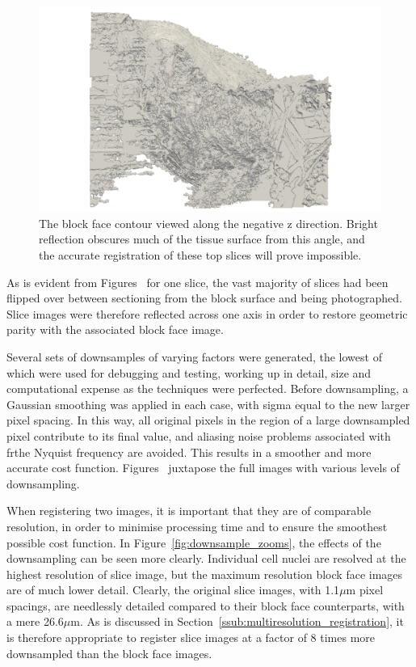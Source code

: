     \begin{figure}
      \centering
      \includegraphics[width=\textheight]{Ch6/Figs/Rat28/contours/LoRes_negative_z}
      \caption{The block face contour viewed along the negative z direction. Bright reflection obscures much of the tissue surface from this angle, and the accurate registration of these top slices will prove impossible.}
      \label{fig:LoRes_negative_z}
    \end{figure}
    
	As is evident from Figures~ for one slice, the vast majority of slices had been flipped over between sectioning from the block surface and being photographed. Slice images were therefore reflected across one axis in order to restore geometric parity with the associated block face image.
	
	 Several sets of downsamples of varying factors were generated, the lowest of which were used for debugging and testing, working up in detail, size and computational expense as the techniques were perfected. Before downsampling, a Gaussian smoothing was applied in each case, with sigma equal to the new larger pixel spacing. In this way, all original pixels in the region of a large downsampled pixel contribute to its final value, and aliasing noise problems associated with frthe Nyquist frequency are avoided. This results in a smoother and more accurate cost function. Figures~ juxtapose the full images with various levels of downsampling.
	 
	 When registering two images, it is important that they are of comparable resolution, in order to minimise processing time and to ensure the smoothest possible cost function. In Figure~\ref{fig:downsample_zooms}, the effects of the downsampling can be seen more clearly. Individual cell nuclei are resolved at the highest resolution of slice image, but the maximum resolution block face images are of much lower detail. Clearly, the original slice images, with 1.1$\mu$m pixel spacings, are needlessly detailed compared to their block face counterparts, with a mere 26.6$\mu$m. As is discussed in Section~\ref{ssub:multiresolution_registration}, it is therefore appropriate to register slice images at a factor of 8 times more downsampled than the block face images.
    
